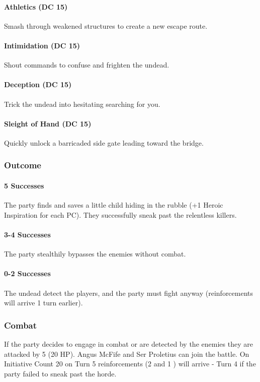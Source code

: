 \paragraph*{Athletics (DC 15)}
{\entryfont Smash through weakened structures to create a new escape route.}
\paragraph*{Intimidation (DC 15)}
{\entryfont Shout commands to confuse and frighten the undead.}
\paragraph*{Deception (DC 15)}
{\entryfont Trick the undead into hesitating searching for you.}
\paragraph*{Sleight of Hand (DC 15)}
{\entryfont Quickly unlock a barricaded side gate leading toward the bridge.}
\subsubsection*{Outcome}
\paragraph*{5 Successes}
{\entryfont The party finds and saves a little child hiding in the rubble (+1 Heroic Inspiration for each PC). They successfully sneak past the relentless killers.}
\paragraph*{3-4 Successes}
{\entryfont The party stealthily bypasses the enemies without combat.}
\paragraph*{0-2 Successes}
{\entryfont The undead detect the players, and the party must fight anyway (reinforcements will arrive 1 turn earlier).}
\subsubsection*{Combat}
{\entryfont If the party decides to engage in combat or are detected by the enemies they are attacked by 5 \hyperref[monster:UndeadSoldier]{} (20 HP). Angus McFife and Ser Proletius can join the battle. On Initiative Count 20 on Turn 5 reinforcements (2 \hyperref[monster:UndeadSoldier]{} and 1 \hyperref[monster:CorruptedUnicorn]{}) will arrive - Turn 4 if the party failed to sneak past the horde.}

